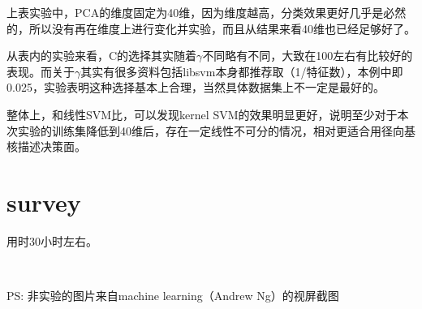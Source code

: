 \documentclass[hyperref,UTF8]{ctexart}
\begin{document}
\begin{table}[!htbp]
  \centering
\caption{kernel SVM分类准确率}
\label{tb:lda_knn}
\end{table}
\par 上表实验中，PCA的维度固定为40维，因为维度越高，分类效果更好几乎是必然的，所以没有再在维度上进行变化并实验，而且从结果来看40维也已经足够好了。
\par 从表内的实验来看，C的选择其实随着$\gamma$不同略有不同，大致在100左右有比较好的表现。而关于$\gamma$其实有很多资料包括libsvm本身都推荐取（1/特征数），本例中即0.025，实验表明这种选择基本上合理，当然具体数据集上不一定是最好的。
\par 整体上，和线性SVM比，可以发现kernel SVM的效果明显更好，说明至少对于本次实验的训练集降低到40维后，存在一定线性不可分的情况，相对更适合用径向基核描述决策面。

\section*{survey}
用时30小时左右。

\par
\
\par PS: 非实验的图片来自machine learning（Andrew Ng）的视屏截图


\end{document}
